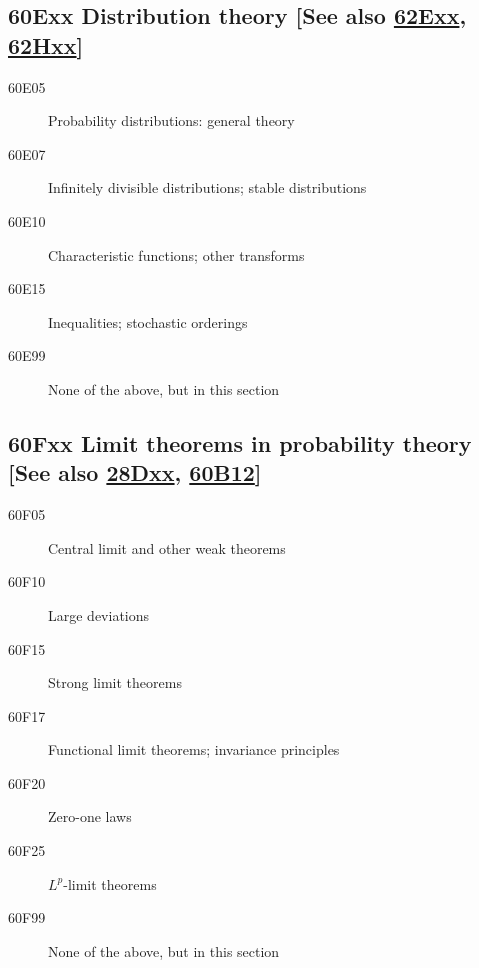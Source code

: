\subsection*{60Exx  Distribution theory [See also \hyperref[62Exx]{62Exx}, \hyperref[62Hxx]{62Hxx}] }\label{60Exx}
\begin{description}  
\item [60E05]\label{60E05} Probability distributions: general theory
\item [60E07]\label{60E07} Infinitely divisible distributions; stable distributions
\item [60E10]\label{60E10} Characteristic functions; other transforms
\item [60E15]\label{60E15} Inequalities; stochastic orderings
\item [60E99]\label{60E99} None of the above, but in this section
\end{description}
\subsection*{60Fxx  Limit theorems in probability theory [See also \hyperref[28Dxx]{28Dxx}, \hyperref[60B12]{60B12}] }\label{60Fxx}
\begin{description}  
\item [60F05]\label{60F05} Central limit and other weak theorems
\item [60F10]\label{60F10} Large deviations
\item [60F15]\label{60F15} Strong limit theorems
\item [60F17]\label{60F17} Functional limit theorems; invariance principles
\item [60F20]\label{60F20} Zero-one laws
\item [60F25]\label{60F25} $L^p$-limit theorems
\item [60F99]\label{60F99} None of the above, but in this section
\end{description}
